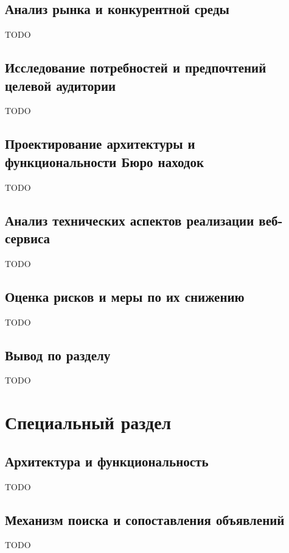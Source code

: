 \documentclass{mirea}
\begin{document}
\subsection{Анализ рынка и конкурентной среды}

TODO

\subsection{Исследование потребностей и предпочтений целевой аудитории}

TODO

\subsection{Проектирование архитектуры и функциональности Бюро находок}

TODO

\subsection{Анализ технических аспектов реализации веб-сервиса}

TODO

\subsection{Оценка рисков и меры по их снижению}

TODO

\subsection*{Вывод по разделу}

TODO

\section{Специальный раздел}

\subsection{Архитектура и функциональность}

TODO

\subsection{Механизм поиска и сопоставления объявлений}

TODO
\end{document}
